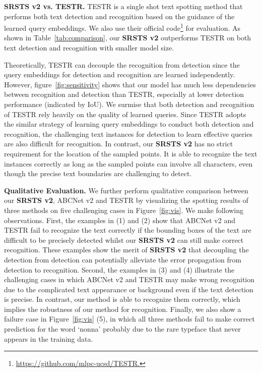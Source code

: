 \smallskip\noindent\textbf{SRSTS v2 vs. TESTR.}
TESTR is a single shot text spotting method that performs both text detection and recognition based on the guidance of the learned query embeddings. We also use their official code\footnote{\label{website}\url{https://github.com/mlpc-ucsd/TESTR.}} for evaluation. As shown in Table~\ref{tab:comparison}, our \textbf{SRSTS v2} outperforms TESTR on both text detection and recognition with smaller model size. 

Theoretically, TESTR can decouple the recognition from detection since the query embeddings for detection and recognition are learned independently. However, figure~\ref{fig:sensitivity} shows that our model has much less dependencies between recognition and detection than TESTR, especially at lower detection performance (indicated by IoU). We surmise that both detection and recognition of TESTR rely heavily on the quality of learned queries. Since TESTR adopts the similar strategy of learning query embeddings to conduct both detection and recognition, the challenging text instances for detection to learn effective queries are also difficult for recognition. In contrast, our \textbf{SRSTS v2} has no strict requirement for the location of the sampled points. It is able to recognize the text instances correctly as long as the sampled points can involve all characters, even though the precise text boundaries are challenging to detect.




\smallskip\noindent\textbf{Qualitative Evaluation.} 
We further perform qualitative comparison between our \textbf{SRSTS v2}, ABCNet v2 and TESTR by visualizing the spotting results of three methods on five challenging cases in Figure~\ref{fig:vis}. We make following observations. First, the examples in (1) and (2) show that ABCNet v2 and TESTR fail to recognize the text correctly if the bounding boxes of the text are difficult to be precisely detected whilst our \textbf{SRSTS v2} can still make correct recognition. These examples show the merit of \textbf{SRSTS v2} that decoupling the detection from detection can potentially alleviate the error propagation from detection to recognition. Second, the examples in (3) and (4) illustrate the challenging cases in which ABCNet v2 and TESTR may make wrong recognition due to the complicated text appearance or background even if the text detection is precise. In contrast, our method is able to recognize them correctly, which implies the robustness of our method for recognition. Finally, we also show a failure case in Figure~\ref{fig:vis} (5), in which all three methods fail to make correct prediction for the word `nonna' probably due to the rare typeface that never appears in the training data.







